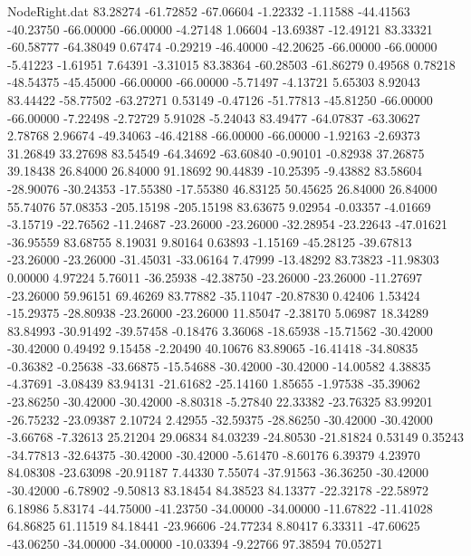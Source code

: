 \begin{filecontents}{NodeRight.dat}
  83.28274  -61.72852  -67.06604    -1.22332   -1.11588  -44.41563  -40.23750  -66.00000  -66.00000   -4.27148    1.06604  -13.69387  -12.49121
  83.33321  -60.58777  -64.38049     0.67474   -0.29219  -46.40000  -42.20625  -66.00000  -66.00000   -5.41223   -1.61951    7.64391   -3.31015
  83.38364  -60.28503  -61.86279     0.49568    0.78218  -48.54375  -45.45000  -66.00000  -66.00000   -5.71497   -4.13721    5.65303    8.92043
  83.44422  -58.77502  -63.27271     0.53149   -0.47126  -51.77813  -45.81250  -66.00000  -66.00000   -7.22498   -2.72729    5.91028   -5.24043
  83.49477  -64.07837  -63.30627     2.78768    2.96674  -49.34063  -46.42188  -66.00000  -66.00000   -1.92163   -2.69373   31.26849   33.27698
  83.54549  -64.34692  -63.60840    -0.90101   -0.82938   37.26875   39.18438   26.84000   26.84000   91.18692   90.44839  -10.25395   -9.43882
  83.58604  -28.90076  -30.24353   -17.55380  -17.55380   46.83125   50.45625   26.84000   26.84000   55.74076   57.08353 -205.15198 -205.15198
  83.63675    9.02954   -0.03357    -4.01669   -3.15719  -22.76562  -11.24687  -23.26000  -23.26000  -32.28954  -23.22643  -47.01621  -36.95559
  83.68755    8.19031    9.80164     0.63893   -1.15169  -45.28125  -39.67813  -23.26000  -23.26000  -31.45031  -33.06164    7.47999  -13.48292
  83.73823  -11.98303    0.00000     4.97224    5.76011  -36.25938  -42.38750  -23.26000  -23.26000  -11.27697  -23.26000   59.96151   69.46269
  83.77882  -35.11047  -20.87830     0.42406    1.53424  -15.29375  -28.80938  -23.26000  -23.26000   11.85047   -2.38170    5.06987   18.34289
  83.84993  -30.91492  -39.57458    -0.18476    3.36068  -18.65938  -15.71562  -30.42000  -30.42000    0.49492    9.15458   -2.20490   40.10676
  83.89065  -16.41418  -34.80835    -0.36382   -0.25638  -33.66875  -15.54688  -30.42000  -30.42000  -14.00582    4.38835   -4.37691   -3.08439
  83.94131  -21.61682  -25.14160     1.85655   -1.97538  -35.39062  -23.86250  -30.42000  -30.42000   -8.80318   -5.27840   22.33382  -23.76325
  83.99201  -26.75232  -23.09387     2.10724    2.42955  -32.59375  -28.86250  -30.42000  -30.42000   -3.66768   -7.32613   25.21204   29.06834
  84.03239  -24.80530  -21.81824     0.53149    0.35243  -34.77813  -32.64375  -30.42000  -30.42000   -5.61470   -8.60176    6.39379    4.23970
  84.08308  -23.63098  -20.91187     7.44330    7.55074  -37.91563  -36.36250  -30.42000  -30.42000   -6.78902   -9.50813   83.18454   84.38523
  84.13377  -22.32178  -22.58972     6.18986    5.83174  -44.75000  -41.23750  -34.00000  -34.00000  -11.67822  -11.41028   64.86825   61.11519
  84.18441  -23.96606  -24.77234     8.80417    6.33311  -47.60625  -43.06250  -34.00000  -34.00000  -10.03394   -9.22766   97.38594   70.05271

\end{filecontents}
